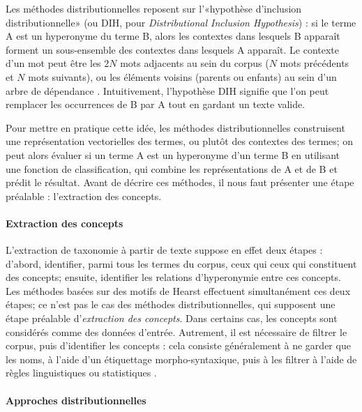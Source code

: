 Les méthodes distributionnelles reposent sur l'«hypothèse d'inclusion distributionnelle» (ou DIH, pour \textit{Distributional Inclusion Hypothesis}) \cite{geffet2005distributional} : si le terme A est un hyperonyme du terme B, alors les contextes dans lesquels B apparaît forment un sous-ensemble des contextes dans lesquels A apparaît. Le contexte d'un mot peut être les $2N$ mots adjacents au sein du corpus ($N$ mots précédents et $N$ mots suivants), ou les éléments voisins (parents ou enfants) au sein d'un arbre de dépendance \cite{shwartz-etal-2017-hypernyms}.
Intuitivement, l'hypothèse DIH signifie que l'on peut remplacer les occurrences de B par A tout en gardant un texte valide.

Pour mettre en pratique cette idée, les méthodes distributionnelles construisent une représentation vectorielles des termes, ou plutôt des contextes des termes; on peut alors évaluer si un terme A est un hyperonyme d'un terme B en utilisant une fonction de classification, qui combine les représentations de A et de B et prédit le résultat. Avant de décrire ces méthodes, il nous faut présenter une étape préalable : l'extraction des concepts.


\paragraph{Extraction des concepts}

L'extraction de taxonomie à partir de texte suppose en effet deux étapes : d'abord, identifier, parmi tous les termes du corpus, ceux qui ceux qui constituent des concepts; ensuite, identifier les relations d'hyperonymie entre ces concepts. Les méthodes basées sur des motifs de Hearst effectuent simultanément ces deux étapes; ce n'est pas le cas des méthodes distributionnelles, qui supposent une étape préalable d'\textit{extraction des concepts}. Dans certains cas, les concepts sont considérés comme des données d'entrée. %
Autrement, il est nécessaire de filtrer le corpus, puis d'identifier les concepts : cela consiste généralement à ne garder que les noms, à l'aide d'un étiquettage morpho-syntaxique, puis à les filtrer à l'aide de règles linguistiques ou statistiques \cite{shang2018automated}. %

\paragraph{Approches distributionnelles}

